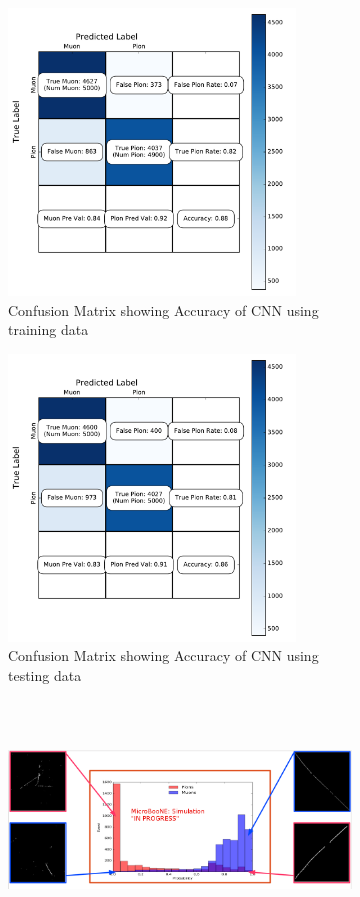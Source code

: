 \begin{figure}[htp!]
\centering
	\begin{subfigure}[b]{.45\textwidth}
	\includegraphics[width=\textwidth,height=3in]{figs/train_confusion.pdf}
	\caption{Confusion Matrix showing Accuracy of CNN using training data}
	\label{fig:confusion}
	\end{subfigure}
	\quad
	\begin{subfigure}[b]{.45\textwidth}
	\includegraphics[width=\textwidth,height=3in]{figs/val_confusion.pdf}
	\caption{Confusion Matrix showing Accuracy of CNN using testing data}
	\label{fig:confusion_test}
	\end{subfigure}
	\quad
	\begin{subfigure}[b]{\textwidth}
	\includegraphics[width=\textwidth,height=2.5in]{figs/mitch_hw.png}

\end{subfigure}
\end{figure}
